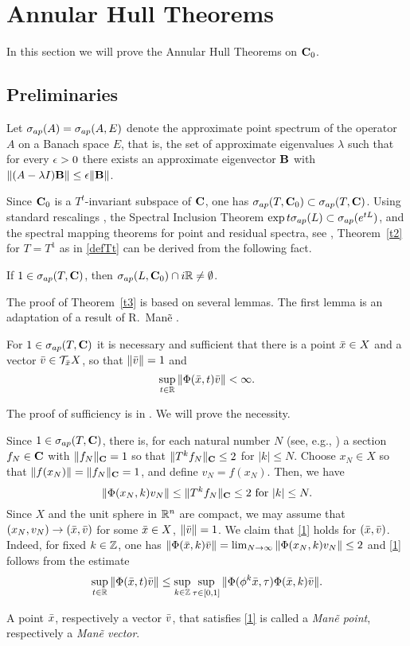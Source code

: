 \section{Annular Hull Theorems}
In this section we will prove 
the Annular Hull Theorems on ${{\bold C}_0}$. 
\subsection{Preliminaries}
Let $\sigma_{ap}(A)=\sigma_{ap}(A,E)$ denote the approximate point spectrum
of the operator $A$ on a Banach space $E$, that is, the set of approximate
eigenvalues $\lambda$ such that for every $\epsilon>0$ there exists
an approximate eigenvector 
${\bold B}$ with $\|(A-\lambda I){\bold B}\|\leq\epsilon\|{\bold B}\|$.

Since ${{\bold C}_0}$ is a $T^t$-invariant subspace of ${\bold C}$, 
one has $\sigma_{ap}(T,{{\bold C}_0})\subset\sigma_{ap}(T,{\bold C})$.
Using standard rescalings \cite[p.~14]{Nagel},
the Spectral Inclusion Theorem 
$\exp t\sigma_{ap}(L)\subset\sigma_{ap}(e^{tL})$,
and the spectral mapping theorems for point and residual spectra, see
\cite[pp.~84--85]{Nagel}, 
Theorem~\ref{t2} for $T=T^1$ as in \eqref{defTt}
can be derived from the following fact.
\begin{thm} 
If $1\in \sigma_{ap} (T,{\bold C})$, then 
$\sigma_{ap} (L,{{\bold C}_0}) \cap i{\Bbb{R}} \neq\emptyset$.
\end{thm}

The proof of  Theorem~\ref{t3}  
is based on several lemmas. 
The first lemma is an adaptation of a result of R.~Man\~e \cite{Mane}.
\begin{lem}
For $1\in \sigma_{ap} (T,{\bold C})$ it is necessary and sufficient
that there is a point ${\bar x} \in X$ and a
vector ${\bar v}\in {\cal{T}}_{\bar x} X$, so that $\|{\bar v}\| =1$ and
\begin{equation}
\sup_{t\in\bbR} \| \Phi (\bx, t) \bv\| < \infty.
\lb{1}
\end{equation}
\end{lem}
\begin{pf} The proof of sufficiency is in \cite{Mane}.
We will prove the necessity.

Since $1\in \sigma_{ap} (T,{\bold C})$, there is, for each natural number
$N$ 
(see, e.g., \cite[Lemma 2.6]{clms})
a section $f_N\in {\bold C}$ with $\|f_N\|_{\bold C}=1$ 
so that $\|T^kf_N\|_{{\bold C}}\le 2$ for $|k|\le N$. Choose
$x_N\in X$ so that $\|f(x_N)\|=\|f_N\|_{{\bold C}}=1$, and define
$v_N=f(x_N)$. Then, we have  
\[
\|\Phi(x_N,k)v_N\|\le \|T^kf_N\|_{{\bold C}}\leq 2\mbox{ for  }
|k|\le N.
\]
Since $X$ and the unit sphere in ${\Bbb{R}}^n$ are compact,
we may assume that $(x_N,v_N)\to ({\bar x},{\bar v})$ for some ${\bar x}\in X$, 
$\|{\bar v}\|=1$. We claim that \eqref{1} holds for $({\bar x},{\bar v})$.
Indeed, for 
fixed $k\in{\Bbb{Z}}$, one has 
$\|\Phi({\bar x},k){\bar v}\|=\lim_{N\to\infty}\|\Phi(x_N,k)v_N\|\le 2$
and \eqref{1} follows from the estimate
\[\sup_{t\in{\Bbb{R}}}
\|\Phi({\bar x},t){\bar v}\|
\le \sup_{k\in{\Bbb{Z}}}\sup_{\tau\in[0,1]}
\|\Phi(\phi^k{\bar x},\tau)\Phi({\bar x},k){\bar v}\|.\]
\end{pf}
\begin{defn} A point ${\bar x}$, respectively a  vector ${\bar v}$, 
that satisfies \eqref{1} is called a {\em Man\~e point}, respectively
a {\em Man\~e vector}.
\end{defn}

